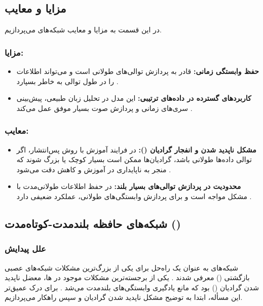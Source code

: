 \subsection{مزایا و معایب }
در این قسمت به مزایا و معایب شبکه‌های  می‌پردازیم.

\subsubsection{مزایا:}
\begin{itemize}
	\item \textbf{حفظ وابستگی زمانی:}  
	 قادر به پردازش توالی‌های طولانی است و می‌تواند اطلاعات را در طول توالی به خاطر بسپارد
	\cite{elman1990finding}.
	
	\item \textbf{کاربردهای گسترده در داده‌های ترتیبی:}  
	این مدل در تحلیل زبان طبیعی، پیش‌بینی سری‌های زمانی و پردازش صوت بسیار موفق عمل می‌کند
	\cite{gers1999learning}.
\end{itemize}

\subsubsection{معایب:}
\begin{itemize}
	\item \textbf{مشکل ناپدید شدن و انفجار گرادیان ():}  
	در فرایند آموزش با روش پس‌انتشار، اگر توالی داده‌ها طولانی باشد، گرادیان‌ها ممکن است بسیار کوچک یا بزرگ شوند که منجر به ناپایداری در آموزش و کاهش دقت می‌شود
	\cite{hochreiter1998vanishing}.
	
	\item \textbf{محدودیت در پردازش توالی‌های بسیار بلند:}  
	 در حفظ اطلاعات طولانی‌مدت با مشکل مواجه است و برای پردازش وابستگی‌های طولانی، عملکرد ضعیفی دارد
	\cite{hochreiter1997long,goodfellow2016deep}.
\end{itemize}

\subsection{شبکه‌های حافظه بلندمدت-کوتاه‌مدت ()}

\subsubsection{علل پیدایش }
شبکه‌های  به عنوان یک راه‌حل برای یکی از بزرگ‌ترین مشکلات شبکه‌های عصبی بازگشتی () معرفی شدند
\cite{hochreiter1997long}.
یکی از برجسته‌ترین مشکلات موجود در ها، معضل ناپدید شدن گرادیان () بود که مانع یادگیری وابستگی‌های بلندمدت می‌شد
\cite{hochreiter1998vanishing,goodfellow2016deep}.
برای درک عمیق‌تر این مسأله، ابتدا به توضیح مشکل ناپدید شدن گرادیان و سپس راهکار  می‌پردازیم.

